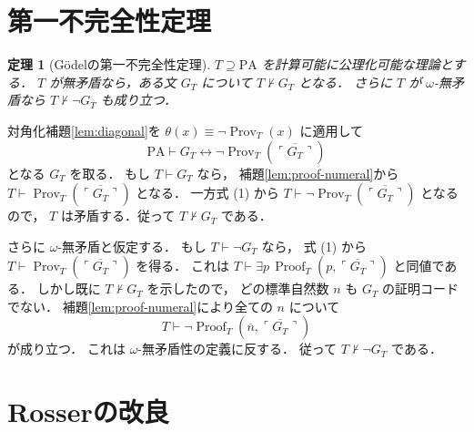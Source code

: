 \documentclass[a5paper,10pt,onecolumn]{jsarticle}
\makeatletter
\theoremstyle{mathnotetheorem}
\newtheorem{theorem}{定理}[section]
\renewcommand{\proofname}{証明}
\renewenvironment{proof}[1][\proofname]{%
  \par\pushQED{\qed}\normalfont\topsep4\p@\@plus2\p@\relax
  \trivlist\item[\hskip\labelsep\bfseries #1]\ignorespaces
}{\popQED\endtrivlist\@endpefalse}
\makeatother
\begin{document}
\section{第一不完全性定理}

\begin{theorem}[Gödelの第一不完全性定理]
\label{thm:first}
$T\supseteq\mathrm{PA}$ を計算可能に公理化可能な理論とする．
$T$ が無矛盾なら，ある文 $G_T$ について
$T\not\vdash G_T$ となる．
さらに $T$ が $\omega$-無矛盾なら
$T\not\vdash\neg G_T$ も成り立つ．
\end{theorem}
\begin{proof}
対角化補題\ref{lem:diagonal}を
$\theta(x)\equiv\neg\operatorname{Prov}_T(x)$ に適用して
\[
 \mathrm{PA}\vdash
 G_T\leftrightarrow
 \neg\operatorname{Prov}_T(\overline{\ulcorner G_T\urcorner})
 \tag{1}
\]
となる $G_T$ を取る．
もし $T\vdash G_T$ なら，
補題\ref{lem:proof-numeral}から
$T\vdash\operatorname{Prov}_T(
 \overline{\ulcorner G_T\urcorner})$ となる．
一方式 (1) から
$T\vdash\neg\operatorname{Prov}_T(
 \overline{\ulcorner G_T\urcorner})$ となるので，
$T$ は矛盾する．従って $T\not\vdash G_T$ である．

さらに $\omega$-無矛盾と仮定する．
もし $T\vdash\neg G_T$ なら，
式 (1) から
$T\vdash\operatorname{Prov}_T(
\overline{\ulcorner G_T\urcorner})$ を得る．
これは
$T\vdash\exists p\,\operatorname{Proof}_T(
 p,\overline{\ulcorner G_T\urcorner})$ と同値である．
しかし既に $T\not\vdash G_T$ を示したので，
どの標準自然数 $n$ も $G_T$ の証明コードでない．
補題\ref{lem:proof-numeral}により全ての $n$ について
\[
 T\vdash\neg\operatorname{Proof}_T(
 \overline n,\overline{\ulcorner G_T\urcorner})
\]
が成り立つ．
これは $\omega$-無矛盾性の定義に反する．
従って $T\not\vdash\neg G_T$ である．
\end{proof}

\section{Rosserの改良}
\end{document}
